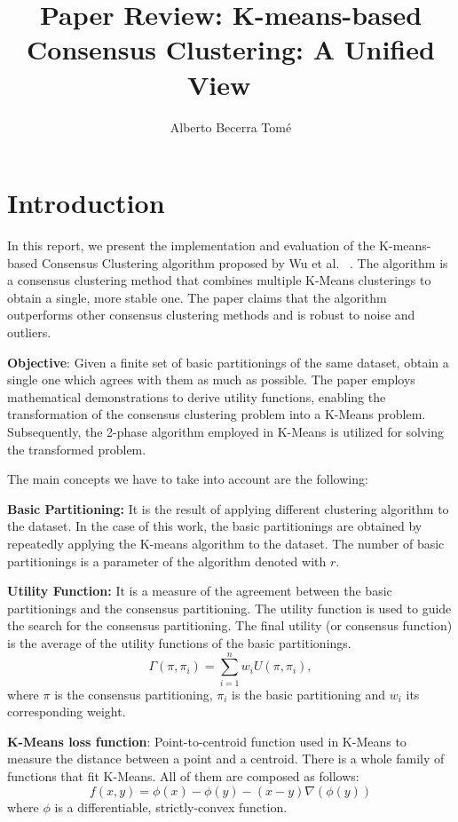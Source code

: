 \documentclass[twocolumn]{article}
\title{Paper Review: K-means-based Consensus Clustering: A Unified View ~\cite{Original}}
\author{Alberto Becerra Tomé}
\date{}
\begin{document}
\maketitle

\section{Introduction}

In this report, we present the implementation and evaluation of the K-means-based Consensus Clustering algorithm proposed 
by Wu et al. ~\cite{Original}. The algorithm is a consensus clustering method that combines multiple K-Means clusterings to 
obtain a single, more stable one. The paper claims that the algorithm outperforms other consensus clustering methods and is 
robust to noise and outliers.


\textbf{Objective}: Given a finite set of basic partitionings of the same dataset, obtain a single one which agrees with them as much
as possible. The paper employs mathematical demonstrations to derive utility functions, enabling the transformation of the consensus 
clustering problem into a K-Means problem. Subsequently, the 2-phase algorithm employed in K-Means is utilized for solving the 
transformed problem.

The main concepts we have to take into account are the following:

\textbf{Basic Partitioning:} It is the result of applying different clustering algorithm to the dataset. In the case of this
        work, the basic partitionings are obtained by repeatedly applying the K-means algorithm to the dataset. The number of basic 
        partitionings is a parameter of the algorithm denoted with $r$.

\textbf{Utility Function:} It is a measure of the agreement between the basic partitionings and the consensus partitioning. 
        The utility function is used to guide the search for the consensus partitioning. The final utility (or consensus function) is the
        average of the utility functions of the basic partitionings.
        \begin{equation}
          \Gamma(\pi, \pi_i) = \sum_{i=1}^{n} w_i U(\pi, \pi_i),
        \end{equation}
        where $\pi$ is the consensus partitioning, $\pi_i$ is the basic partitioning and $w_i$ its corresponding weight.

\textbf{K-Means loss function}: Point-to-centroid function used in K-Means to measure the distance between a point and a centroid. 
        There is a whole family of functions that fit K-Means. All of them are composed as follows:
        \begin{equation}
          f(x, y) = \phi(x) - \phi(y) - (x - y) \nabla(\phi(y))
        \end{equation}
        where $\phi$ is a differentiable, strictly-convex function.
\end{document}
